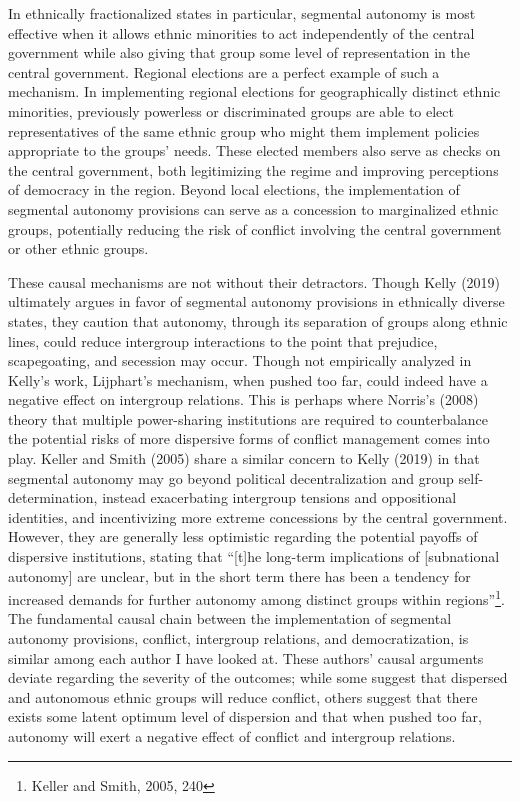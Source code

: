 \documentclass[12pt]{article}
\begin{document}
In ethnically fractionalized states in particular, segmental autonomy is most effective when it allows ethnic minorities to act independently of the central government while also giving that group some level of representation in the central government. Regional elections are a perfect example of such a mechanism. In implementing regional elections for geographically distinct ethnic minorities, previously powerless or discriminated groups are able to elect representatives of the same ethnic group who might them implement policies appropriate to the groups' needs. These elected members also serve as checks on the central government, both legitimizing the regime and improving perceptions of democracy in the region. Beyond local elections, the implementation of segmental autonomy provisions can serve as a concession to marginalized ethnic groups, potentially reducing the risk of conflict involving the central government or other ethnic groups. 

These causal mechanisms are not without their detractors. Though Kelly (2019) ultimately argues in favor of segmental autonomy provisions in ethnically diverse states, they caution that autonomy, through its separation of groups along ethnic lines, could reduce intergroup interactions to the point that prejudice, scapegoating, and secession may occur. Though not empirically analyzed in Kelly’s work, Lijphart’s mechanism, when pushed too far, could indeed have a negative effect on intergroup relations. This is perhaps where Norris’s (2008) theory that multiple power-sharing institutions are required to counterbalance the potential risks of more dispersive forms of conflict management comes into play. Keller and Smith (2005) share a similar concern to Kelly (2019) in that segmental autonomy may go beyond political decentralization and group self-determination, instead exacerbating intergroup tensions and oppositional identities, and incentivizing more extreme concessions by the central government. However, they are generally less optimistic regarding the potential payoffs of dispersive institutions, stating that “[t]he long-term implications of [subnational autonomy] are unclear, but in the short term there has been a tendency for increased demands for further autonomy among distinct groups within regions”\footnote{Keller and Smith, 2005, 240}. The fundamental causal chain between the implementation of segmental autonomy provisions, conflict, intergroup relations, and democratization, is similar among each author I have looked at. These authors’ causal arguments deviate regarding the severity of the outcomes; while some suggest that dispersed and autonomous ethnic groups will reduce conflict, others suggest that there exists some latent optimum level of dispersion and that when pushed too far, autonomy will exert a negative effect of conflict and intergroup relations.  
\end{document}
